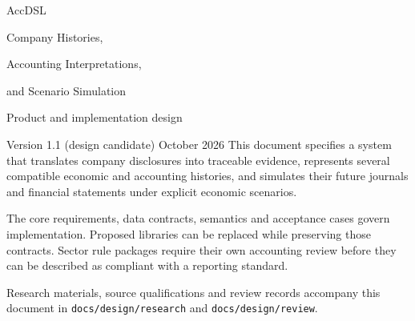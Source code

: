 \documentclass[11pt,a4paper]{report}
\newcommand{\code}[1]{\texttt{#1}}
\begin{document}
\hypersetup{pageanchor=false}
\begin{titlepage}
\vspace*{20mm}
{\sffamily\color{ink}\Huge AccDSL\par}
\vspace{7mm}
{\LARGE Company Histories,\par Accounting Interpretations,\par and Scenario Simulation\par}
\vspace{12mm}
{\Large Product and implementation design\par}
\vspace{5mm}
Version 1.1 (design candidate)  October 2026
\vfill
This document specifies a system that translates company disclosures into
traceable evidence, represents several compatible economic and accounting
histories, and simulates their future journals and financial statements under
explicit economic scenarios.

The core requirements, data contracts, semantics and acceptance cases govern
implementation. Proposed libraries can be replaced while preserving those
contracts. Sector rule packages require their own accounting review before
they can be described as compliant with a reporting standard.

\vspace{8mm}
Research materials, source qualifications and review records accompany this
document in \code{docs/design/research} and \code{docs/design/review}.
\end{titlepage}
\hypersetup{pageanchor=true}
\tableofcontents
\clearpage{}











\appendix



\begingroup\raggedright

\endgroup
\end{document}

